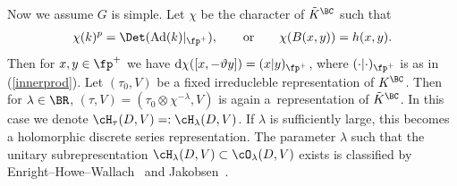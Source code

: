Now we assume $G$ is simple. Let $\chi$ be the character of $\tilde{K}^\BC$ such that
\begin{gather}\label{char}
\chi(k)^p=\Det(\operatorname{Ad}(k)|_{\fp^+}),\qquad \text{or} \qquad \chi(B(x,y))=h(x,y).
\end{gather}
Then for $x,y\in\fp^+$ we have ${\rm d}\chi([x,-\vartheta y])=(x|y)_{\fp^+}$, where $(\cdot|\cdot)_{\fp^+}$ is as in (\ref{innerprod}).
Let $(\tau_0,V)$ be a fixed irreducleble representation of $K^\BC$.
Then for $\lambda\in\BR$, $(\tau,V)=(\tau_0\otimes\chi^{-\lambda},V)$ is again a~representation of $\tilde{K}^\BC$.
In this case we denote $\cH_\tau(D,V)=:\cH_\lambda(D,V)$.
If $\lambda$ is sufficiently large, this becomes a holomorphic discrete series representation.
The parameter $\lambda$ such that the unitary subrepresentation $\cH_\lambda(D,V)\subset\cO_\lambda(D,V)$ exists is classified by
Enright--Howe--Wallach~\cite{EHW} and Jakobsen~\cite{J}.

